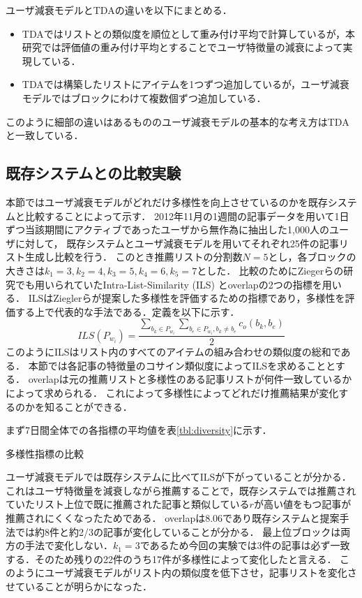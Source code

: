\documentclass[japanese]{jnlp_1.4}
\begin{document}
ユーザ減衰モデルとTDAの違いを以下にまとめる．
\begin{itemize}
	\item TDAではリストとの類似度を順位として重み付け平均で計算しているが，本研究では評価値の重み付け平均とすることでユーザ特徴量の減衰によって実現している．
	\item TDAでは構築したリストにアイテムを1つずつ追加しているが，ユーザ減衰モデルではブロックにわけて複数個ずつ追加している．
\end{itemize}

このように細部の違いはあるもののユーザ減衰モデルの基本的な考え方はTDAと一致している．


\subsection{既存システムとの比較実験}

本節ではユーザ減衰モデルがどれだけ多様性を向上させているのかを既存システムと比較することによって示す．
2012年11月の1週間の記事データを用いて1日ずつ当該期間にアクティブであったユーザから無作為に抽出した1,000人のユーザに対して，
既存システムとユーザ減衰モデルを用いてそれぞれ25件の記事リスト生成し比較を行う．
このとき推薦リストの分割数$N=5$とし，各ブロックの大きさは$k_1=3, k_2=4, k_3=5, k_4=6, k_5=7$とした．
比較のためにZiegerらの研究でも用いられていたIntra-List-Similarity (ILS) とoverlapの2つの指標を用いる\cite{ziegler2005}．
ILSはZieglerらが提案した多様性を評価するための指標であり，多様性を評価する上で代表的な手法である\cite{Konstan2012}．定義を以下に示す．
\[
ILS(P_{w_i}) = \frac{\sum_{b_k \in P_{w_i}} \sum_{b_e \in P_{w_i}, b_k \neq b_e} c_o (b_k, b_e)}{2}
\]
このようにILSはリスト内のすべてのアイテムの組み合わせの類似度の総和である．
本節では各記事の特徴量のコサイン類似度によってILSを求めることとする．
overlapは元の推薦リストと多様性のある記事リストが何件一致しているかによって求められる．
これによって多様性によってどれだけ推薦結果が変化するのかを知ることができる．

まず7日間全体での各指標の平均値を表\ref{tbl:diversity}に示す．

\begin{table}[t]
\caption{多様性指標の比較}
\label{tbl:diversity}

\end{table}

ユーザ減衰モデルでは既存システムに比べてILSが下がっていることが分かる．
これはユーザ特徴量を減衰しながら推薦することで，既存システムでは推薦されていたリスト上位で既に推薦された記事と類似している$r$が高い値をもつ記事が推薦されにくくなったためである．
overlapは8.06であり既存システムと提案手法では約8件と約2/3の記事が変化していることが分かる．
最上位ブロックは両方の手法で変化しない．$k_1=3$であるため今回の実験では3件の記事は必ず一致する．そのため残りの22件のうち17件が多様性によって変化したと言える．
このようにユーザ減衰モデルがリスト内の類似度を低下させ，記事リストを変化させていることが明らかになった．
\end{document}
